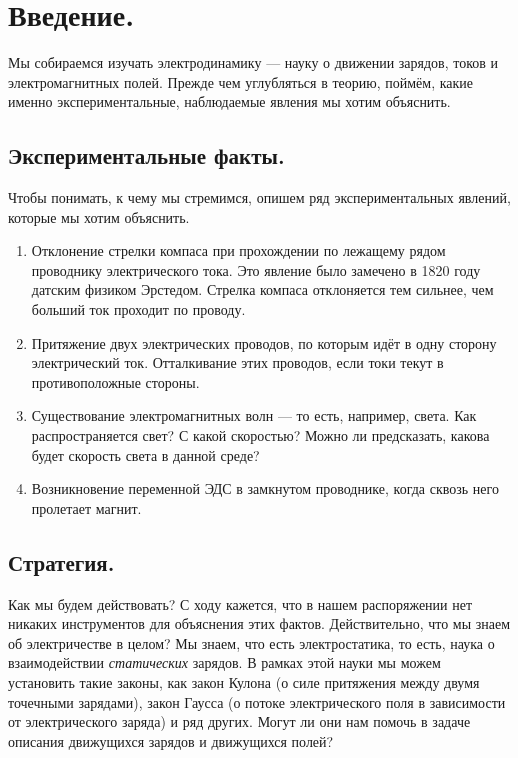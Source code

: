 \documentclass[a4paper,12pt]{article}
\begin{document}
\section{Введение.}
\label{sec:intro}

Мы собираемся изучать электродинамику --- науку о движении зарядов,
токов и электромагнитных полей. Прежде чем углубляться в теорию,
поймём, какие именно экспериментальные, наблюдаемые явления мы хотим
объяснить. 

\subsection{Экспериментальные факты.}
\label{sec:exp_facts}

Чтобы понимать, к чему мы стремимся, опишем ряд экспериментальных
явлений, которые мы хотим объяснить. 

\begin{enumerate}
\item Отклонение стрелки компаса при прохождении по лежащему рядом
  проводнику электрического тока. Это явление было замечено в 1820
  году датским физиком Эрстедом. Стрелка компаса отклоняется тем
  сильнее, чем больший ток проходит по проводу.
\item Притяжение двух электрических проводов, по которым идёт в одну
  сторону электрический ток. Отталкивание этих проводов, если токи
  текут в противоположные стороны.
\item Существование электромагнитных волн --- то есть, например,
  света. Как распространяется свет? С какой скоростью? Можно ли
  предсказать, какова будет скорость света в данной среде?
\item Возникновение переменной ЭДС в замкнутом проводнике, когда сквозь него
  пролетает магнит.
\end{enumerate}

\subsection{Стратегия.}
\label{sec:strategy}

Как мы будем действовать? С ходу кажется, что в нашем распоряжении нет
никаких инструментов для объяснения этих фактов. Действительно, что мы
знаем об электричестве в целом? Мы знаем, что есть электростатика, то
есть, наука о взаимодействии \textit{статических} зарядов. В рамках
этой науки мы можем установить такие законы, как закон Кулона (о силе
притяжения между двумя точечными зарядами), закон Гаусса (о потоке
электрического поля в зависимости от электрического заряда) и ряд
других. Могут ли они нам помочь в задаче описания движущихся зарядов и
движущихся полей? 
\end{document}
